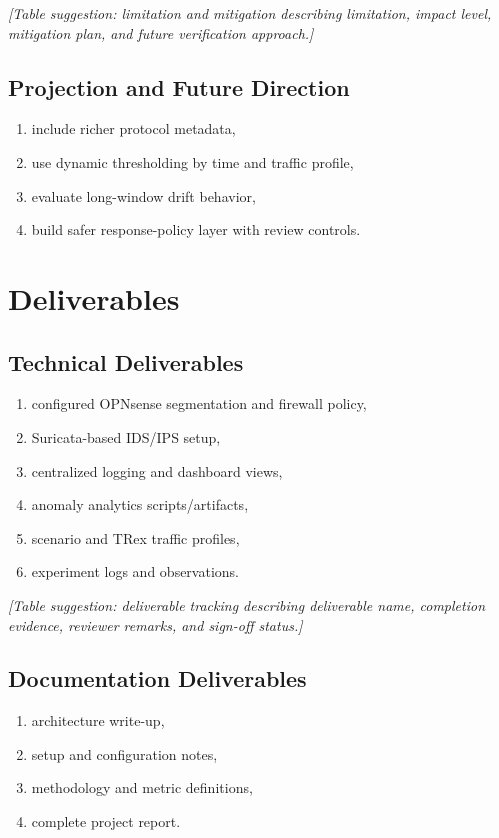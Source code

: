 \documentclass[12pt,a4paper]{article}
\begin{document}
\textit{[Table suggestion: limitation and mitigation describing limitation, impact level, mitigation plan, and future verification approach.]}

\subsection{Projection and Future Direction}
\begin{enumerate}
    \item include richer protocol metadata,
    \item use dynamic thresholding by time and traffic profile,
    \item evaluate long-window drift behavior,
    \item build safer response-policy layer with review controls.
\end{enumerate}

\section{Deliverables}

\subsection{Technical Deliverables}
\begin{enumerate}
    \item configured OPNsense segmentation and firewall policy,
    \item Suricata-based IDS/IPS setup,
    \item centralized logging and dashboard views,
    \item anomaly analytics scripts/artifacts,
    \item scenario and TRex traffic profiles,
    \item experiment logs and observations.
\end{enumerate}

\textit{[Table suggestion: deliverable tracking describing deliverable name, completion evidence, reviewer remarks, and sign-off status.]}

\subsection{Documentation Deliverables}
\begin{enumerate}
    \item architecture write-up,
    \item setup and configuration notes,
    \item methodology and metric definitions,
    \item complete project report.
\end{enumerate}
\end{document}
